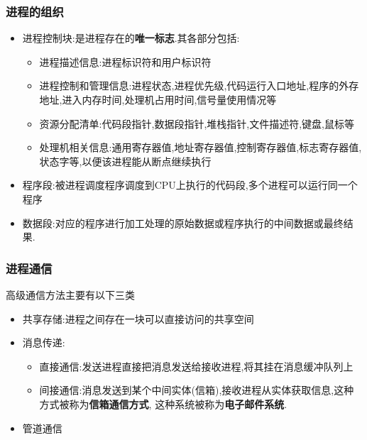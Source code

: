 \documentclass{ctexart}
\begin{document}
\subsubsection{进程的组织}
\begin{itemize}
	\item 进程控制块:是进程存在的\textbf{唯一标志}.其各部分包括:
	      \begin{itemize}
		      \item 进程描述信息:进程标识符和用户标识符
		      \item 进程控制和管理信息:进程状态,进程优先级,代码运行入口地址,程序的外存地址,进入内存时间,处理机占用时间,信号量使用情况等
		      \item 资源分配清单:代码段指针,数据段指针,堆栈指针,文件描述符,键盘,鼠标等
		      \item 处理机相关信息:通用寄存器值,地址寄存器值,控制寄存器值,标志寄存器值,状态字等,以便该进程能从断点继续执行
	      \end{itemize}
	\item 程序段:被进程调度程序调度到CPU上执行的代码段,多个进程可以运行同一个程序
	\item 数据段:对应的程序进行加工处理的原始数据或程序执行的中间数据或最终结果.
\end{itemize}
\subsubsection{进程通信}
高级通信方法主要有以下三类
\begin{itemize}
	\item 共享存储:进程之间存在一块可以直接访问的共享空间
	\item 消息传递:\begin{itemize}
		      \item 直接通信:发送进程直接把消息发送给接收进程,将其挂在消息缓冲队列上
		      \item 间接通信:消息发送到某个中间实体(信箱),接收进程从实体获取信息,这种方式被称为\textbf{信箱通信方式},
		      这种系统被称为\textbf{电子邮件系统}.
	      \end{itemize}
	\item 管道通信
\end{itemize}
\end{document}

